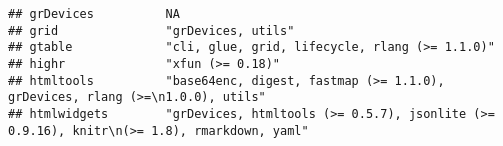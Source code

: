 \documentclass[
]{article}
\begin{document}
\begin{verbatim}
## grDevices          NA                                                                                                                                                                                                                                                                                                                                                                                                                                           
## grid               "grDevices, utils"                                                                                                                                                                                                                                                                                                                                                                                                                           
## gtable             "cli, glue, grid, lifecycle, rlang (>= 1.1.0)"                                                                                                                                                                                                                                                                                                                                                                                               
## highr              "xfun (>= 0.18)"                                                                                                                                                                                                                                                                                                                                                                                                                             
## htmltools          "base64enc, digest, fastmap (>= 1.1.0), grDevices, rlang (>=\n1.0.0), utils"                                                                                                                                                                                                                                                                                                                                                                 
## htmlwidgets        "grDevices, htmltools (>= 0.5.7), jsonlite (>= 0.9.16), knitr\n(>= 1.8), rmarkdown, yaml"                                                                                                                                                                                                                                                                                                                                                    

\end{verbatim}
\end{document}
